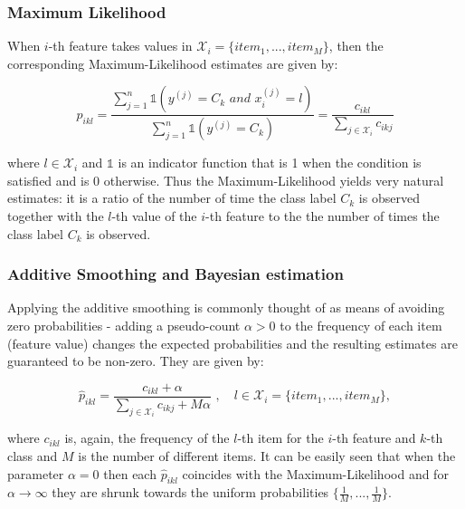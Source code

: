 \documentclass{article}\usepackage[]{graphicx}\usepackage[]{color}
\begin{document}
\subsubsection{Maximum Likelihood}

When $i$-th feature takes values in $\mathcal{X}_i = \{item_1,...,item_M\}$, then the corresponding Maximum-Likelihood estimates are given by:

$$\hat{p}_{ikl} = \frac{\sum_{j=1}^n \mathbb{1}(y^{(j)} = C_k \,\, and \,\, x_i^{(j)} = l)}{\sum_{j=1}^n \mathbb{1}(y^{(j)} = C_k)} = \frac{c_{ikl}}{\sum_{j\in \mathcal{X}_i} c_{ikj}}$$

where $l \in \mathcal{X}_i$ and $\mathbb{1}$ is an indicator function that is 1 when the condition is satisfied and is 0 otherwise. Thus the Maximum-Likelihood yields very natural estimates: it is a ratio of the number of time the class label $C_k$ is observed together with the $l$-th value of the $i$-th feature to the the number of times the class label $C_k$ is observed.

\subsubsection{Additive Smoothing and Bayesian estimation}

Applying the additive smoothing is commonly thought of as means of avoiding zero probabilities - adding a pseudo-count $\alpha > 0$ to the frequency of each item (feature value) changes the expected probabilities and the resulting estimates are guaranteed to be non-zero. They are given by:

$$\hat{p}_{ikl} = \frac{c_{ikl} + \alpha}{\sum_{j\in \mathcal{X}_i} c_{ikj} + M\alpha}\,\,, \,\,\,\,\,\, l \in \mathcal{X}_i = \{item_1,...,item_M\}, $$

where $c_{ikl}$ is, again, the frequency of the $l$-th item for the $i$-th feature and $k$-th class and $M$ is the number of different items. It can be easily seen that when the parameter $\alpha = 0$ then each $\hat{p}_{ikl}$ coincides with the Maximum-Likelihood and for $\alpha \rightarrow \infty$ they are shrunk towards the uniform probabilities $\{\frac{1}{M},...,\frac{1}{M} \}$.
\end{document}
